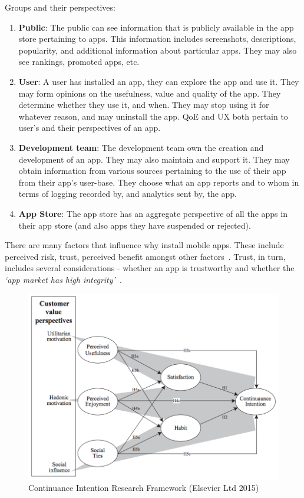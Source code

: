 Groups and their perspectives:
\begin{enumerate}
    \item \textbf{Public}: The public can see information that is publicly available in the app store pertaining to apps. This information includes screenshots, descriptions, popularity, and additional information about particular apps. They may also see rankings, promoted apps, etc.
    \item \textbf{User}: A user has installed an app, they can explore the app and use it. They may form opinions on the usefulness, value and quality of the app. They determine whether they use it, and when. They may stop using it for whatever reason, and may uninstall the app. QoE and UX both pertain to user's and their perspectives of an app.
    \item \textbf{Development team}: The development team own the creation and development of an app. They may also maintain and support it. They may obtain information from various sources pertaining to the use of their app from their app's user-base. They choose what an app reports and to whom in terms of logging recorded by, and analytics sent by, the app.
    \item \textbf{App Store}: The app store has an aggregate perspective of all the apps in their app store (and also apps they have suspended or rejected).
\end{enumerate}

There are many factors that influence why install mobile apps. These include perceived risk, trust, perceived benefit amongst other factors~\cite{harris2016identifying}. Trust, in turn, includes several considerations - whether an app is trustworthy and whether the \emph{`app market has high integrity'}~\cite{harris2016identifying}.

\begin{figure}[htbp!]
    \centering
    \includegraphics[width=13cm]{images/Consumer_Value_Perspectives_screenshot.png}
    \caption{Continuance Intention Research Framework (\textcopyright Elsevier Ltd 2015)}
    \label{fig:consumer_value_perspectives_elsevier}
\end{figure}

